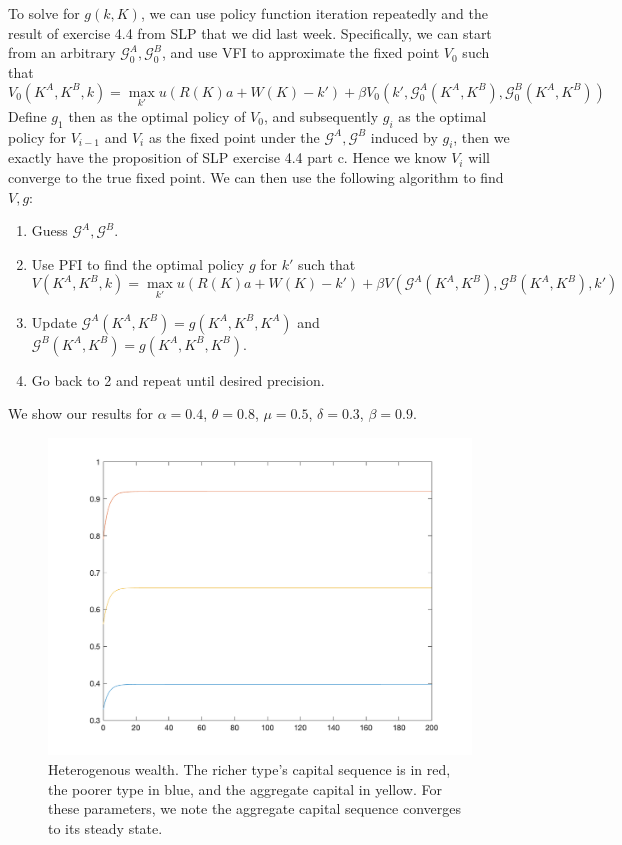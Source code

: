 \documentclass[10pt,letter]{article}
\begin{document}
To solve for $g(k, K)$, we can use policy function iteration repeatedly and the result of exercise 4.4 from SLP that we did last week. Specifically, we can start from an arbitrary $\mathcal{G}^A_0, \mathcal{G}^B_0$, and use VFI to approximate the fixed point $V_0$ such that
\[ V_0(K^A, K^B, k) = \max_{k'} u(R(K)a + W(K) - k') + \beta V_0(k', \mathcal{G}^A_0(K^A, K^B), \mathcal{G}^B_0(K^A, K^B)) \]
Define $g_1$ then as the optimal policy of $V_0$, and subsequently $g_i$ as the optimal policy for $V_{i-1}$ and $V_i$ as the fixed point under the $\mathcal{G}^A, \mathcal{G}^B$ induced by $g_i$, then we exactly have the proposition of SLP exercise 4.4 part c. Hence we know $V_i$ will converge to the true fixed point. We can then use the following algorithm to find $V, g$:
\begin{enumerate}
\item Guess $\mathcal{G}^A, \mathcal{G}^B$.
\item Use PFI to find the optimal policy $g$ for $k'$ such that
\[ V(K^A, K^B, k) = \max_{k'} u(R(K)a + W(K) - k') + \beta V(\mathcal{G}^A(K^A, K^B),\mathcal{G}^B(K^A, K^B),k') \]
\item Update $\mathcal{G}^A(K^A, K^B) = g(K^A, K^B, K^A)$ and $\mathcal{G}^B(K^A, K^B) = g(K^A, K^B, K^B)$.
\item Go back to 2 and repeat until desired precision.
\end{enumerate}

We show our results for $\alpha = 0.4$, $\theta = 0.8$, $\mu = 0.5$, $\delta=0.3$, $\beta = 0.9$.

\begin{figure}
\includegraphics[scale=0.8]{ps4q3}
\caption{Heterogenous wealth. The richer type's capital sequence is in red, the poorer type in blue, and the aggregate capital in yellow. For these parameters, we note the aggregate capital sequence converges to its steady state.}
\end{figure}
\end{document}
